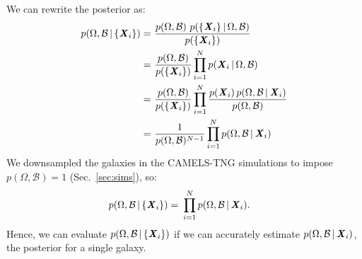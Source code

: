 We can rewrite the posterior as: 
\begin{align}
p(\Omega, \mathcal{B} \,|\, \{{\textbf{\textit{X}}_i}\}) 
    =&~\frac{p(\Omega, \mathcal{B})~p(\{{\textbf{\textit{X}}_i}\} \,|\, \Omega,
    \mathcal{B})}{p(\{{\textbf{\textit{X}}_i}\})}\\
    =&~\frac{p(\Omega, \mathcal{B})}{p(\{\textbf{\textit{X}}_i\})}\prod\limits_{i=1}^N 
    p({\textbf{\textit{X}}_i}\,|\, \Omega, \mathcal{B})\\
    =&~\frac{p(\Omega, \mathcal{B})}{p(\{\textbf{\textit{X}}_i\})}\prod\limits_{i=1}^N 
    \frac{p(\textbf{\textit{X}}_i)\,p(\Omega, \mathcal{B}\,|\,{\textbf{\textit{X}}_i})}{p(\Omega,
    \mathcal{B})}\\
    =&~\frac{1}{p(\Omega, \mathcal{B})^{N-1}}\prod\limits_{i=1}^N p(\Omega,
    \mathcal{B}\,|\, {\textbf{\textit{X}}_i})
\end{align} 
We downsampled the galaxies in the CAMELS-TNG simulations to impose 
$p(\Omega, \mathcal{B}) = 1$ (Sec.~\ref{sec:sims}), so:
\begin{align}
p(\Omega, \mathcal{B} \,|\, \{{\textbf{\textit{X}}_i}\}) 
    =&~\prod\limits_{i=1}^N p(\Omega, \mathcal{B}\,|\, {\textbf{\textit{X}}_i}).
    \label{eq:posterior}
\end{align} 
Hence, we can evaluate $p(\Omega, \mathcal{B} \,|\, \{{\textbf{\textit{X}}_i}\})$ if we can
accurately estimate $p(\Omega, \mathcal{B}\,|\, {\textbf{\textit{X}}_i})$, the posterior
for a single galaxy. 

